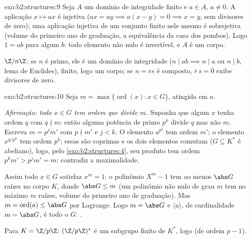 \begin{solution}{exo:b2:structures:9}
Seja $A$ um domínio de integridade finito e $a \in A$, $a \neq 0$. A
aplicação $x \mapsto ax$ é injetiva ($ax = ay \implies a(x - y) = 0
\implies x = y$, sem divisores de zero); uma aplicação injetiva de um conjunto finito
nele mesmo é sobrejetiva (volume do primeiro ano de graduação, a equivalência da casa dos pombos).
Logo $1 = ab$ para algum $b$: todo elemento não nulo é invertível, e $A$
é um corpo.

$\Z/n\Z$: se $n$ é primo, ele é um domínio de integridade ($n \mid ab
\implies n \mid a$ ou $n \mid b$, lema de Euclides), finito, logo um
corpo; se $n = rs$ é composto, $\overline r\,\overline s =
\overline 0$ exibe divisores de zero.
\end{solution}

\begin{solution}{exo:b2:structures:10}
Seja $m = \max\{\operatorname{ord}(x) : x \in G\}$, atingida em $a$.

\emph{Afirmação: todo $x \in G$ tem ordem que divide $m$.} Suponha que algum
$x$ tenha ordem $q$ com $q \nmid m$: então alguma potência de primo $p^k$
divide $q$ mas não $m$. Escreva $m = p^j m'$ com $p \nmid m'$ e $j
< k$. O elemento $a^{p^j}$ tem ordem $m'$; o elemento
$x^{q/p^k}$ tem ordem $p^k$; essas  são coprimas e os dois
elementos comutam ($G \subseteq K^*$ é abeliano), logo, pelo
\cref{exo:b2:structures:4}, seu produto tem ordem $p^k m' > p^j m'
= m$: contradiz a maximalidade.

Assim todo $x \in G$ satisfaz $x^m = 1$: o polinômio $X^m - 1$ tem ao
menos $\abs G$ raízes no corpo $K$, donde $\abs G \leq m$
(um polinômio não nulo de grau $m$ tem no máximo $m$ raízes, volume do primeiro
ano de graduação). Mas $m = \operatorname{ord}(a) \leq \abs G$ por Lagrange.
Logo $m = \abs G$ e $\langle a \rangle$, de cardinalidade $m =
\abs G$, é todo o $G$: .

Para $K = \Z/p\Z$: $(\Z/p\Z)^*$ é um subgrupo finito de $K^*$, logo
 (de ordem $p - 1$).
\end{solution}

